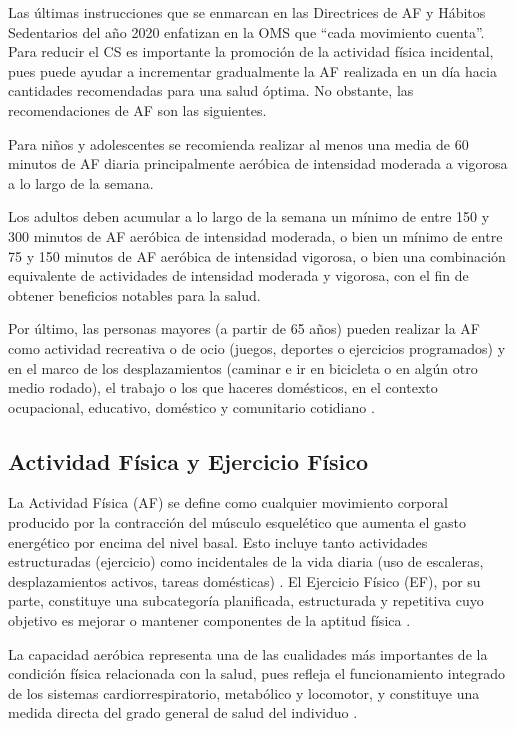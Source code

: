 Las últimas instrucciones que se enmarcan en las Directrices de AF y Hábitos Sedentarios del año 2020 enfatizan en la OMS que ``cada movimiento cuenta''. Para reducir el CS es importante la promoción de la actividad física incidental, pues puede ayudar a incrementar gradualmente la AF realizada en un día hacia cantidades recomendadas para una salud óptima. No obstante, las recomendaciones de AF son las siguientes.

Para niños y adolescentes se recomienda realizar al menos una media de 60 minutos de AF diaria principalmente aeróbica de intensidad moderada a vigorosa a lo largo de la semana.

Los adultos deben acumular a lo largo de la semana un mínimo de entre 150 y 300 minutos de AF aeróbica de intensidad moderada, o bien un mínimo de entre 75 y 150 minutos de AF aeróbica de intensidad vigorosa, o bien una combinación equivalente de actividades de intensidad moderada y vigorosa, con el fin de obtener beneficios notables para la salud.

Por último, las personas mayores (a partir de 65 años) pueden realizar la AF como actividad recreativa o de ocio (juegos, deportes o ejercicios programados) y en el marco de los desplazamientos (caminar e ir en bicicleta o en algún otro medio rodado), el trabajo o los que haceres domésticos, en el contexto ocupacional, educativo, doméstico y comunitario cotidiano \citep{Bull2020,WHO2020GuidelinesAnnex}.

\subsection{Actividad Física y Ejercicio Físico}
\label{subsec:af_ef}

La Actividad Física (AF) se define como cualquier movimiento corporal producido por la contracción del músculo esquelético que aumenta el gasto energético por encima del nivel basal. Esto incluye tanto actividades estructuradas (ejercicio) como incidentales de la vida diaria (uso de escaleras, desplazamientos activos, tareas domésticas) \citep{Caspersen1985,Reyes2023Actividad}. El Ejercicio Físico (EF), por su parte, constituye una subcategoría planificada, estructurada y repetitiva cuyo objetivo es mejorar o mantener componentes de la aptitud física \citep{Caspersen1985}.

La capacidad aeróbica representa una de las cualidades más importantes de la condición física relacionada con la salud, pues refleja el funcionamiento integrado de los sistemas cardiorrespiratorio, metabólico y locomotor, y constituye una medida directa del grado general de salud del individuo \citep{Riebe2018ACSM,Gonzalez2018Analisis}.

